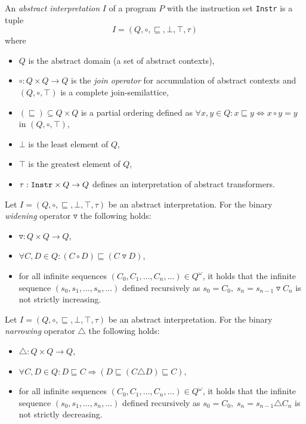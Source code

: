 \begin{defn}
An \emph{abstract interpretation} $I$ of a program $P$ with the instruction set \texttt{Instr} is a tuple $$I = (Q, \circ, \sqsubseteq, \bot, \top, \tau)$$ where
\begin{itemize}
    \item $Q$ is the abstract domain (a set of abstract contexts),
    \item $\circ: Q \times Q \rightarrow Q$ is the \emph{join operator} for accumulation of abstract contexts and $(Q, \circ, \top)$ is a complete join-semilattice,
    \item $(\sqsubseteq) \subseteq Q \times Q$ is a partial ordering defined as $\forall x, y \in Q: x \sqsubseteq y \Leftrightarrow x \circ y = y$ in $(Q,\circ, \top)$,
    \item $\bot$ is the least element of $Q$,
    \item $\top$ is the greatest element of $Q$,
    \item $\tau: \text{\texttt{Instr}}\times Q \rightarrow Q$ defines an interpretation of abstract transformers.
\end{itemize}
\end{defn}

\begin{defn}
Let $I = (Q, \circ, \sqsubseteq, \bot, \top, \tau)$ be an abstract interpretation. For the binary \emph{widening} operator $\triangledown$ the following holds:
\begin{itemize}
    \item $\triangledown: Q \times Q \rightarrow Q$,
    \item $\forall C,D \in Q: (C \circ D) \sqsubseteq (C \triangledown D)$,
    \item for all infinite sequences $(C_0, C_1, \dots, C_n, \dots) \in Q^\omega$, it holds that the infinite sequence $(s_0, s_1, \dots, s_n, \dots)$ defined recursively as $s_0 = C_0, \; s_n = s_{n-1} \triangledown C_n$ is not strictly increasing.
\end{itemize}
\end{defn}

\begin{defn}
Let $I = (Q, \circ, \sqsubseteq, \bot, \top, \tau)$ be an abstract interpretation. For the binary \emph{narrowing} operator $\triangle$ the following holds:
\begin{itemize}
    \item $\triangle: Q \times Q \rightarrow Q$,
    \item $\forall C,D \in Q: D \sqsubseteq C \Rightarrow (D \sqsubseteq (C \triangle D) \sqsubseteq C)$,
    \item for all infinite sequences $(C_0, C_1, \dots, C_n, \dots) \in Q^\omega$, it holds that the infinite sequence $(s_0, s_1, \dots, s_n, \dots)$ defined recursively as $s_0 = C_0, \; s_n = s_{n-1} \triangle C_n$ is not strictly decreasing.
\end{itemize}
\end{defn}

